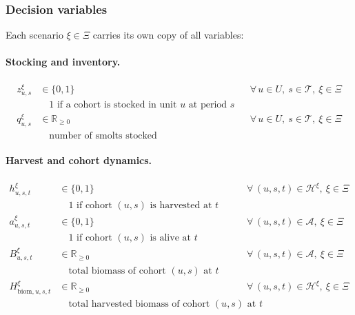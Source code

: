 \documentclass[12pt,a4paper]{article}
\begin{document}
\subsubsection{Decision variables}
 
Each scenario $\xi \in \Xi$ carries its own copy of all variables:
 
\paragraph{Stocking and inventory.}
\begin{align*}
  z^\xi_{u,s} &\in \{0,1\} && \forall\, u \in U,\ s \in \mathcal{T},\ \xi \in \Xi \\
    &\quad \text{1 if a cohort is stocked in unit } u \text{ at period } s \\
  q^\xi_{u,s} &\in \mathbb{R}_{\geq 0} && \forall\, u \in U,\ s \in \mathcal{T},\ \xi \in \Xi \\
    &\quad \text{number of smolts stocked}
\end{align*}
 
\paragraph{Harvest and cohort dynamics.}
\begin{align*}
  h^\xi_{u,s,t} &\in \{0,1\} && \forall\, (u,s,t) \in \mathcal{H}^\xi,\ \xi \in \Xi \\
    &\quad \text{1 if cohort } (u,s) \text{ is harvested at } t \\
  a^\xi_{u,s,t} &\in \{0,1\} && \forall\, (u,s,t) \in \mathcal{A},\ \xi \in \Xi \\
    &\quad \text{1 if cohort } (u,s) \text{ is alive at } t \\
  B^\xi_{u,s,t} &\in \mathbb{R}_{\geq 0} && \forall\, (u,s,t) \in \mathcal{A},\ \xi \in \Xi \\
    &\quad \text{total biomass of cohort } (u,s) \text{ at } t \\
  H^\xi_{\mathrm{biom},u,s,t} &\in \mathbb{R}_{\geq 0} && \forall\, (u,s,t) \in \mathcal{H}^\xi,\ \xi \in \Xi \\
    &\quad \text{total harvested biomass of cohort } (u,s) \text{ at } t
\end{align*}
 
\end{document}
